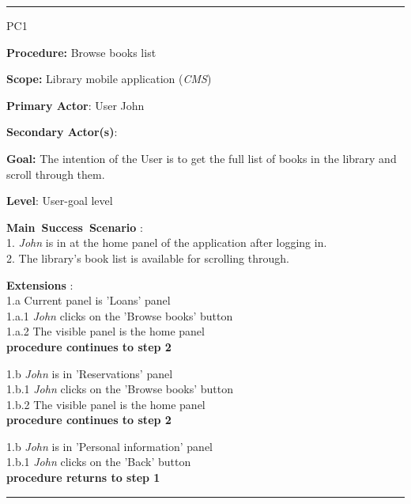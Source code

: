 \vspace{0.5cm}
\hrule
\begin{lyxlist}{PC1}
\small{
\item [\textbf{Procedure:}] Browse books list
\item [\textbf{Scope:}] Library mobile application (\emph{CMS})
\item [\textbf{Primary Actor}:] User John
\item [\textbf{Secondary Actor(s)}:] 
\item [\textbf{Goal:}] The intention of the User is to get the full list of
books in the library and scroll through them.
\item [\textbf{Level}:] User-goal level
\item [\textbf{Main~Success~Scenario}]:\\
1. \emph{John} is in at the home panel of the application after logging in.\\
2. The library's book list is available for scrolling through.\\


\item [\textbf{Extensions}]:\\
1.a Current panel is 'Loans' panel\\
\hspace*{0.5cm} 1.a.1 \emph{John} clicks on the 'Browse books' button\\
\hspace*{0.5cm} 1.a.2 The visible panel is the home panel\\
\hspace*{0.5cm} \textbf{procedure continues to step 2}

1.b \emph{John} is in 'Reservations' panel\\
\hspace*{0.5cm} 1.b.1 \emph{John} clicks on the 'Browse books' button\\
\hspace*{0.5cm} 1.b.2 The visible panel is the home panel\\
\hspace*{0.5cm} \textbf{procedure continues to step 2}

1.b \emph{John} is in 'Personal information' panel\\
\hspace*{0.5cm} 1.b.1 \emph{John} clicks on the 'Back' button\\
\hspace*{0.5cm} \textbf{procedure returns to step 1}

}


\end{lyxlist}
\hrule

